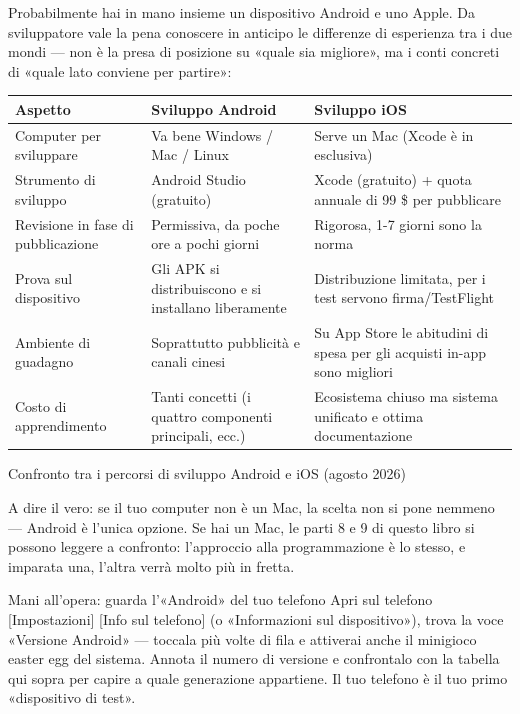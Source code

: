 
Probabilmente hai in mano insieme un dispositivo Android e uno Apple. Da sviluppatore vale la pena conoscere in anticipo le differenze di esperienza tra i due mondi — non è la presa di posizione su «quale sia migliore», ma i conti concreti di «quale lato conviene per partire»:

\begin{center}
\begin{tabularx}{\linewidth}{|X|X|X|}
\hline
\textbf{Aspetto} & \textbf{Sviluppo Android} & \textbf{Sviluppo iOS} \tabularnewline
\hline
Computer per sviluppare & Va bene Windows / Mac / Linux & Serve un Mac (Xcode è in esclusiva) \tabularnewline
Strumento di sviluppo & Android Studio (gratuito) & Xcode (gratuito) + quota annuale di 99 \$ per pubblicare \tabularnewline
Revisione in fase di pubblicazione & Permissiva, da poche ore a pochi giorni & Rigorosa, 1-7 giorni sono la norma \tabularnewline
Prova sul dispositivo & Gli APK si distribuiscono e si installano liberamente & Distribuzione limitata, per i test servono firma/TestFlight \tabularnewline
Ambiente di guadagno & Soprattutto pubblicità e canali cinesi & Su App Store le abitudini di spesa per gli acquisti in-app sono migliori \tabularnewline
Costo di apprendimento & Tanti concetti (i quattro componenti principali, ecc.) & Ecosistema chiuso ma sistema unificato e ottima documentazione \tabularnewline
\hline
\end{tabularx}
\end{center}

\begin{center}\small\color{gray}Confronto tra i percorsi di sviluppo Android e iOS (agosto 2026)\end{center}

A dire il vero: se il tuo computer non è un Mac, la scelta non si pone nemmeno — Android è l'unica opzione. Se hai un Mac, le parti 8 e 9 di questo libro si possono leggere a confronto: l'approccio alla programmazione è lo stesso, e imparata una, l'altra verrà molto più in fretta.

\begin{tcbpractice}{Mani all'opera: guarda l'«Android» del tuo telefono}
Apri sul telefono [Impostazioni] [Info sul telefono] (o «Informazioni sul dispositivo»), trova la voce «Versione Android» — toccala più volte di fila e attiverai anche il minigioco easter egg del sistema. Annota il numero di versione e confrontalo con la tabella qui sopra per capire a quale generazione appartiene. Il tuo telefono è il tuo primo «dispositivo di test».

\end{tcbpractice}

